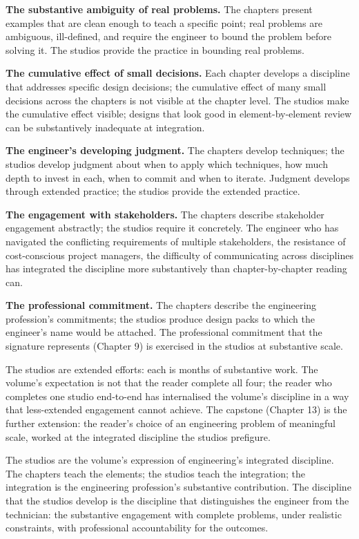 \textbf{The substantive ambiguity of real problems.} The chapters present examples that are clean enough to teach a specific point; real problems are ambiguous, ill-defined, and require the engineer to bound the problem before solving it. The studios provide the practice in bounding real problems.

\textbf{The cumulative effect of small decisions.} Each chapter develops a discipline that addresses specific design decisions; the cumulative effect of many small decisions across the chapters is not visible at the chapter level. The studios make the cumulative effect visible; designs that look good in element-by-element review can be substantively inadequate at integration.

\textbf{The engineer's developing judgment.} The chapters develop techniques; the studios develop judgment about when to apply which techniques, how much depth to invest in each, when to commit and when to iterate. Judgment develops through extended practice; the studios provide the extended practice.

\textbf{The engagement with stakeholders.} The chapters describe stakeholder engagement abstractly; the studios require it concretely. The engineer who has navigated the conflicting requirements of multiple stakeholders, the resistance of cost-conscious project managers, the difficulty of communicating across disciplines has integrated the discipline more substantively than chapter-by-chapter reading can.

\textbf{The professional commitment.} The chapters describe the engineering profession's commitments; the studios produce design packs to which the engineer's name would be attached. The professional commitment that the signature represents (Chapter 9) is exercised in the studios at substantive scale.

The studios are extended efforts: each is months of substantive work. The volume's expectation is not that the reader complete all four; the reader who completes one studio end-to-end has internalised the volume's discipline in a way that less-extended engagement cannot achieve. The capstone (Chapter 13) is the further extension: the reader's choice of an engineering problem of meaningful scale, worked at the integrated discipline the studios prefigure.

\begin{archetype}[ethics]
The studios are the volume's expression of engineering's integrated discipline. The chapters teach the elements; the studios teach the integration; the integration is the engineering profession's substantive contribution. The discipline that the studios develop is the discipline that distinguishes the engineer from the technician: the substantive engagement with complete problems, under realistic constraints, with professional accountability for the outcomes.
\end{archetype}

